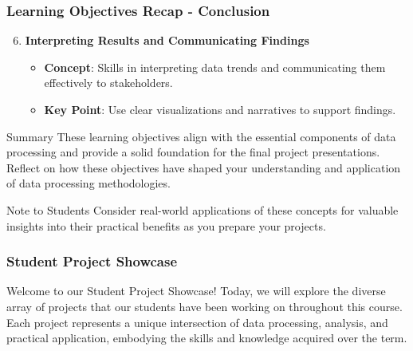 \documentclass[aspectratio=169]{beamer}
\begin{document}
\begin{frame}[fragile]
    \frametitle{Learning Objectives Recap - Conclusion}
    \begin{enumerate}
        \setcounter{enumi}{5}
        \item \textbf{Interpreting Results and Communicating Findings}
        \begin{itemize}
            \item \textbf{Concept}: Skills in interpreting data trends and communicating them effectively to stakeholders.
            \item \textbf{Key Point}: Use clear visualizations and narratives to support findings.
        \end{itemize}
    \end{enumerate}
    
    \begin{block}{Summary}
        These learning objectives align with the essential components of data processing and provide a solid foundation for the final project presentations. 
        Reflect on how these objectives have shaped your understanding and application of data processing methodologies.
    \end{block}
    
    \begin{block}{Note to Students}
        Consider real-world applications of these concepts for valuable insights into their practical benefits as you prepare your projects.
    \end{block}
\end{frame}

\begin{frame}[fragile]
    \frametitle{Student Project Showcase}
    Welcome to our Student Project Showcase! Today, we will explore the diverse array of projects that our students have been working on throughout this course. Each project represents a unique intersection of data processing, analysis, and practical application, embodying the skills and knowledge acquired over the term.
\end{frame}
\end{document}

